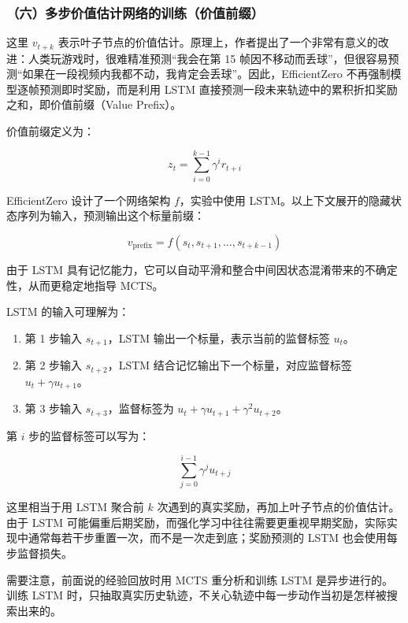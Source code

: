 \hypertarget{ux516dux591aux6b65ux4ef7ux503cux4f30ux8ba1ux7f51ux7edcux7684ux8badux7ec3ux4ef7ux503cux524dux7f00}{%
\subsubsection{（六）多步价值估计网络的训练（价值前缀）}\label{ux516dux591aux6b65ux4ef7ux503cux4f30ux8ba1ux7f51ux7edcux7684ux8badux7ec3ux4ef7ux503cux524dux7f00}}

这里 \(v_{t+k}\) 表示叶子节点的价值估计。原理上，作者提出了一个非常有意义的改进：人类玩游戏时，很难精准预测``我会在第 15 帧因不移动而丢球''，但很容易预测``如果在一段视频内我都不动，我肯定会丢球''。因此，EfficientZero 不再强制模型逐帧预测即时奖励，而是利用 LSTM 直接预测一段未来轨迹中的累积折扣奖励之和，即价值前缀（Value Prefix）。

价值前缀定义为：

\[
z_t = \sum_{i=0}^{k-1} \gamma^i r_{t+i}
\]

EfficientZero 设计了一个网络架构 \(f\)，实验中使用 LSTM。以上下文展开的隐藏状态序列为输入，预测输出这个标量前缀：

\[
v_{\mathrm{prefix}}
= f(s_t, s_{t+1}, \ldots, s_{t+k-1})
\]

由于 LSTM 具有记忆能力，它可以自动平滑和整合中间因状态混淆带来的不确定性，从而更稳定地指导 MCTS。

LSTM 的输入可理解为：

\begin{enumerate}
\def\labelenumi{\arabic{enumi}.}
\tightlist
\item
  第 1 步输入 \(s_{t+1}\)，LSTM 输出一个标量，表示当前的监督标签 \(u_t\)。
\item
  第 2 步输入 \(s_{t+2}\)，LSTM 结合记忆输出下一个标量，对应监督标签 \(u_t + \gamma u_{t+1}\)。
\item
  第 3 步输入 \(s_{t+3}\)，监督标签为 \(u_t + \gamma u_{t+1} + \gamma^2 u_{t+2}\)。
\end{enumerate}

第 \(i\) 步的监督标签可以写为：

\[
\sum_{j=0}^{i-1} \gamma^j u_{t+j}
\]

这里相当于用 LSTM 聚合前 \(k\) 次遇到的真实奖励，再加上叶子节点的价值估计。由于 LSTM 可能偏重后期奖励，而强化学习中往往需要更重视早期奖励，实际实现中通常每若干步重置一次，而不是一次走到底；奖励预测的 LSTM 也会使用每步监督损失。

需要注意，前面说的经验回放时用 MCTS 重分析和训练 LSTM 是异步进行的。训练 LSTM 时，只抽取真实历史轨迹，不关心轨迹中每一步动作当初是怎样被搜索出来的。

